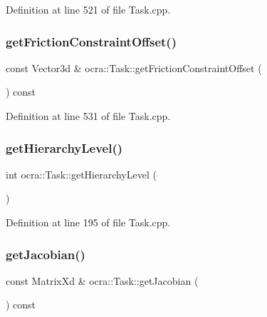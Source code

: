 Definition at line 521 of file Task.\+cpp.

\hypertarget{classocra_1_1Task_ae608885a660ae09ad80e85f7505a0dcb}{}\label{classocra_1_1Task_ae608885a660ae09ad80e85f7505a0dcb} 
\subsubsection{\texorpdfstring{get\+Friction\+Constraint\+Offset()}{getFrictionConstraintOffset()}}
{\footnotesize\ttfamily const Vector3d \& ocra\+::\+Task\+::get\+Friction\+Constraint\+Offset (\begin{DoxyParamCaption}{ }\end{DoxyParamCaption}) const}



Definition at line 531 of file Task.\+cpp.

\hypertarget{classocra_1_1Task_a244bb1942ffb8788fd7b8dba560f5b09}{}\label{classocra_1_1Task_a244bb1942ffb8788fd7b8dba560f5b09} 
\subsubsection{\texorpdfstring{get\+Hierarchy\+Level()}{getHierarchyLevel()}}
{\footnotesize\ttfamily int ocra\+::\+Task\+::get\+Hierarchy\+Level (\begin{DoxyParamCaption}{ }\end{DoxyParamCaption})}



Definition at line 195 of file Task.\+cpp.

\hypertarget{classocra_1_1Task_ae9a3a6ca73165b0a148f6e3a26c9961d}{}\label{classocra_1_1Task_ae9a3a6ca73165b0a148f6e3a26c9961d} 
\subsubsection{\texorpdfstring{get\+Jacobian()}{getJacobian()}}
{\footnotesize\ttfamily const Matrix\+Xd \& ocra\+::\+Task\+::get\+Jacobian (\begin{DoxyParamCaption}{ }\end{DoxyParamCaption}) const}




